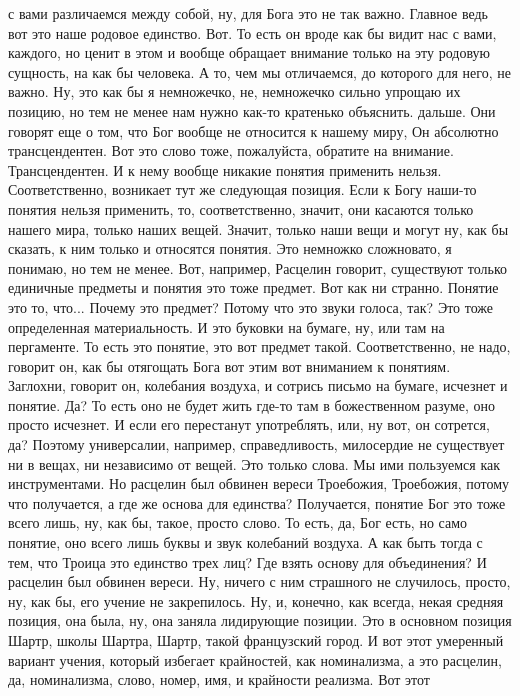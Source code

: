 с вами различаемся между собой, ну, для Бога это не так важно. Главное ведь вот
это наше родовое единство. Вот. То есть он вроде как бы видит нас с вами,
каждого, но ценит в этом и вообще обращает внимание только на эту родовую
сущность, на как бы человека. А то, чем мы отличаемся, до которого для него, не
важно. Ну, это как бы я немножечко, не, немножечко сильно упрощаю их позицию, но
тем не менее нам нужно как-то кратенько объяснить. дальше. Они говорят еще о
том, что Бог вообще не относится к нашему миру, Он абсолютно трансцендентен. Вот
это слово тоже, пожалуйста, обратите на внимание. Трансцендентен. И к нему
вообще никакие понятия применить нельзя. Соответственно, возникает тут же
следующая позиция. Если к Богу наши-то понятия нельзя применить, то,
соответственно, значит, они касаются только нашего мира, только наших вещей.
Значит, только наши вещи и могут ну, как бы сказать, к ним только и относятся
понятия. Это немножко сложновато, я понимаю, но тем не менее. Вот, например,
Расцелин говорит, существуют только единичные предметы и понятия это тоже
предмет. Вот как ни странно. Понятие это то, что... Почему это предмет? Потому
что это звуки голоса, так? Это тоже определенная материальность. И это буковки
на бумаге, ну, или там на пергаменте. То есть это понятие, это вот предмет
такой. Соответственно, не надо, говорит он, как бы отягощать Бога вот этим вот
вниманием к понятиям. Заглохни, говорит он, колебания воздуха, и сотрись письмо
на бумаге, исчезнет и понятие. Да? То есть оно не будет жить где-то там в
божественном разуме, оно просто исчезнет. И если его перестанут употреблять,
или, ну вот, он сотрется, да? Поэтому универсалии, например, справедливость,
милосердие не существует ни в вещах, ни независимо от вещей. Это только слова.
Мы ими пользуемся как инструментами. Но расцелин был обвинен вереси Троебожия,
Троебожия, потому что получается, а где же основа для единства? Получается,
понятие Бог это тоже всего лишь, ну, как бы, такое, просто слово. То есть, да,
Бог есть, но само понятие, оно всего лишь буквы и звук колебаний воздуха. А как
быть тогда с тем, что Троица это единство трех лиц? Где взять основу для
объединения? И расцелин был обвинен вереси. Ну, ничего с ним страшного не
случилось, просто, ну, как бы, его учение не закрепилось. Ну, и, конечно, как
всегда, некая средняя позиция, она была, ну, она заняла лидирующие позиции. Это
в основном позиция Шартр, школы Шартра, Шартр, такой французский город. И вот
этот умеренный вариант учения, который избегает крайностей, как номинализма, а
это расцелин, да, номинализма, слово, номер, имя, и крайности реализма. Вот этот
